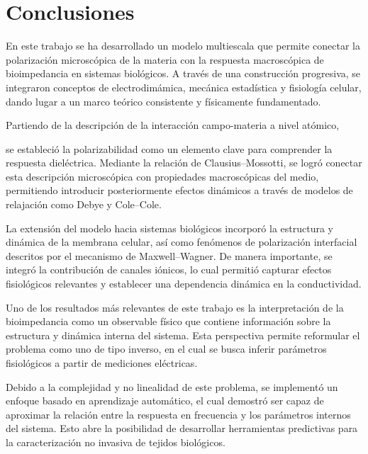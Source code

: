 \documentclass[12pt]{article}
\begin{document}

\section{Conclusiones}

\label{sec:conclusions}


En este trabajo se ha desarrollado un modelo multiescala que permite conectar
la polarizaci\'on microsc\'opica de la materia con la respuesta macrosc\'opica de
bioimpedancia en sistemas biol\'ogicos. A trav\'es de una construcci\'on progresiva,
se integraron conceptos de electrodim\'amica, mec\'anica estad\'istica y fisiolog\'ia
celular, dando lugar a un marco te\'orico consistente y f\'isicamente fundamentado.

Partiendo de la descripci\'on de la interacci\'on campo-materia a nivel at\'omico,

se estableci\'o la polarizabilidad como un elemento clave para comprender la
respuesta diel\'ectrica. Mediante la relaci\'on de Clausius--Mossotti, se logr\'o
conectar esta descripci\'on microsc\'opica con propiedades macrosc\'opicas del medio,
permitiendo introducir posteriormente efectos din\'amicos a trav\'es de modelos
de relajaci\'on como Debye y Cole--Cole.

La extensi\'on del modelo hacia sistemas biol\'ogicos incorpor\'o la estructura y
din\'amica de la membrana celular, as\'i como fen\'omenos de polarizaci\'on interfacial
descritos por el mecanismo de Maxwell--Wagner. De manera importante, se integr\'o
la contribuci\'on de canales i\'onicos, lo cual permiti\'o capturar efectos
fisiol\'ogicos relevantes y establecer una dependencia din\'amica en la conductividad.

Uno de los resultados m\'as relevantes de este trabajo es la interpretaci\'on de la
bioimpedancia como un observable f\'isico que contiene informaci\'on sobre la
estructura y din\'amica interna del sistema. Esta perspectiva permite reformular
el problema como uno de tipo inverso, en el cual se busca inferir par\'ametros
fisiol\'ogicos a partir de mediciones el\'ectricas.

Debido a la complejidad y no linealidad de este problema, se implement\'o un enfoque
basado en aprendizaje autom\'atico, el cual demostr\'o ser capaz de aproximar la
relaci\'on entre la respuesta en frecuencia y los par\'ametros internos del sistema.
Esto abre la posibilidad de desarrollar herramientas predictivas para la
caracterizaci\'on no invasiva de tejidos biol\'ogicos.
\end{document}
